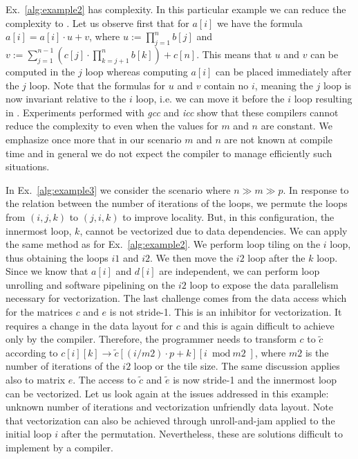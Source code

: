 Ex.~\ref{alg:example2} has  complexity. In this particular
example we can reduce the complexity to . Let us observe first that
for $a[i]$ we have the formula $a[i] = a[i] \cdot u + v$, where $u :=
\prod_{j=1}^n b[j]$ and $v := \sum_{j=1}^{n-1} ( c[j] \cdot \prod_{k=j+1}^n
b[k]) + c[n]$. This means that $u$ and $v$ can be computed in the $j$ loop
whereas computing $a[i]$ can be placed immediately after the $j$ loop. Note that
the formulas for $u$ and $v$ contain no $i$, meaning the $j$ loop is now
invariant relative to the $i$ loop, i.e. we can move it before the $i$ loop
resulting in . Experiments performed with \textit{gcc} and
\textit{icc} show that these compilers cannot reduce the complexity to  even when the values for $m$ and $n$ are constant. We emphasize once more
that in our scenario $m$ and $n$ are not known at compile time and in general we
do not expect the compiler to manage efficiently such situations.

In Ex.~\ref{alg:example3} we consider the scenario where $n \gg m \gg p$. In
response to the relation between the number of iterations of the loops, we
permute the loops from $(i,j,k)$ to $(j,i,k)$ to improve locality. But, in this
configuration, the innermost loop, $k$, cannot be vectorized due to data
dependencies. We can apply the same method as for Ex.~\ref{alg:example2}. We
perform loop tiling on the $i$ loop, thus obtaining the loops $\textit{i1}$ and
$\textit{i2}$. We then move the $\textit{i2}$ loop after the $k$ loop. Since we
know that $a[i]$ and $d[i]$ are independent, we can perform loop unrolling and
software pipelining on the $\textit{i2}$ loop to expose the data parallelism
necessary for vectorization. The last challenge comes from the data access which
for the matrices $c$ and $e$ is not stride-1. This is an inhibitor for
vectorization. It requires a change in the data layout for $c$ and this is again
difficult to achieve only by the compiler. Therefore, the programmer needs to
transform $c$ to $\tilde{c}$ according to $c[i][k] \rightarrow
\tilde{c}[(i/\textit{m2}) \cdot p + k][i \bmod \textit{m2}]$, where
$\textit{m2}$ is the number of iterations of the $\textit{i2}$ loop or the tile
size. The same discussion applies also to matrix $e$. The access to $\tilde{c}$
and $\tilde{e}$ is now stride-1 and the innermost loop can be vectorized. Let us
look again at the issues addressed in this example: unknown number of iterations
and vectorization unfriendly data layout. Note that vectorization can also be
achieved through unroll-and-jam applied to the initial loop $i$ after the
permutation. Nevertheless, these are solutions difficult to implement by a
compiler.

